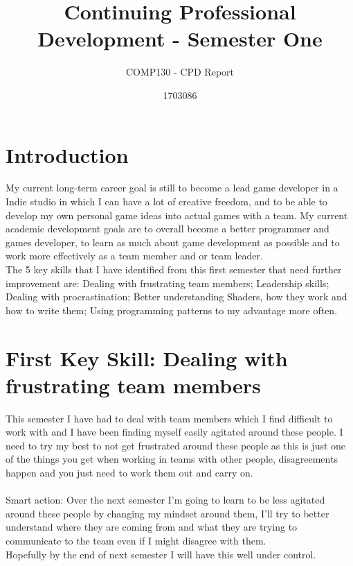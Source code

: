 \documentclass{scrartcl}
\title{Continuing Professional Development - Semester One}
\subtitle{COMP130 - CPD Report}
\author{1703086}
\begin{document}
\maketitle

\section{Introduction}
My current long-term career goal is still to become a lead game developer in a Indie studio in which I can have a lot of creative freedom, and to be able to develop my own personal game ideas into actual games with a team. My current academic development goals are to overall become a better programmer and games developer, to learn as much about game development as possible and to work more effectively as a team member and or team leader.
\\
The 5 key skills that I have identified from this first semester that need further improvement are: Dealing with frustrating team members; Leadership skills; Dealing with procrastination; Better understanding Shaders, how they work and how to write them; Using programming patterns to my advantage more often.


\section{First Key Skill: Dealing with frustrating team members}
This semester I have had to deal with team members which I find difficult to work with and I have been finding myself easily agitated around these people. I need to try my best to not get frustrated around these people as this is just one of the things you get when working in teams with other people, disagreements happen and you just need to work them out and carry on.
\\
\\
Smart action: Over the next semester I'm going to learn to be less agitated around these people by changing my mindset around them, I'll try to better understand where they are coming from and what they are trying to communicate to the team even if I might disagree with them.
\\
Hopefully by the end of next semester I will have this well under control.
\end{document}
